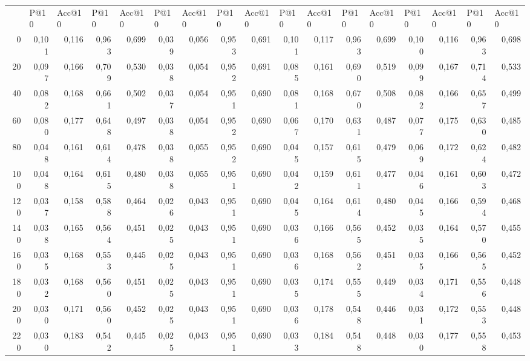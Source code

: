 \begin{table}[htb]
{\begin{tabular}{@{}rrrrrrrrrrrrrrrrr@{}}
\multicolumn{1}{l}{} & \multicolumn{1}{l}{P@10} & \multicolumn{1}{l}{Acc@10} & \multicolumn{1}{l}{P@10} & \multicolumn{1}{l}{Acc@10} & \multicolumn{1}{l}{P@10} & \multicolumn{1}{l}{Acc@10} & \multicolumn{1}{l}{P@10} & \multicolumn{1}{l}{Acc@10} & \multicolumn{1}{l}{P@10} & \multicolumn{1}{l}{Acc@10} & \multicolumn{1}{l}{P@10} & \multicolumn{1}{l}{Acc@10} & \multicolumn{1}{l}{P@10} & \multicolumn{1}{l}{Acc@10} & \multicolumn{1}{l}{P@10} & \multicolumn{1}{l}{Acc@10} \\ \cmidrule(r){1-17}
0 & 0,101 & 0,116 & 0,963 & 0,699 & 0,039 & 0,056 & 0,953 & 0,691 & 0,101 & 0,117 & 0,963 & 0,699 & 0,100 & 0,116 & 0,963 & 0,698 \\
20 & 0,097 & 0,166 & 0,709 & 0,530 & 0,038 & 0,054 & 0,952 & 0,691 & 0,085 & 0,161 & 0,690 & 0,519 & 0,099 & 0,167 & 0,714 & 0,533 \\
40 & 0,082 & 0,168 & 0,661 & 0,502 & 0,037 & 0,054 & 0,951 & 0,690 & 0,081 & 0,168 & 0,670 & 0,508 & 0,082 & 0,166 & 0,657 & 0,499 \\
60 & 0,080 & 0,177 & 0,648 & 0,497 & 0,038 & 0,054 & 0,952 & 0,690 & 0,067 & 0,170 & 0,631 & 0,487 & 0,077 & 0,175 & 0,630 & 0,485 \\
80 & 0,048 & 0,161 & 0,614 & 0,478 & 0,038 & 0,055 & 0,952 & 0,690 & 0,045 & 0,157 & 0,615 & 0,479 & 0,069 & 0,172 & 0,624 & 0,482 \\
100 & 0,048 & 0,164 & 0,615 & 0,480 & 0,038 & 0,055 & 0,951 & 0,690 & 0,042 & 0,159 & 0,611 & 0,477 & 0,046 & 0,161 & 0,603 & 0,472 \\
120 & 0,037 & 0,158 & 0,588 & 0,464 & 0,026 & 0,043 & 0,951 & 0,690 & 0,045 & 0,164 & 0,614 & 0,480 & 0,045 & 0,166 & 0,594 & 0,468 \\
140 & 0,038 & 0,165 & 0,564 & 0,451 & 0,025 & 0,043 & 0,951 & 0,690 & 0,036 & 0,166 & 0,565 & 0,452 & 0,035 & 0,164 & 0,570 & 0,455 \\
160 & 0,035 & 0,168 & 0,553 & 0,445 & 0,025 & 0,043 & 0,951 & 0,690 & 0,036 & 0,168 & 0,562 & 0,451 & 0,035 & 0,166 & 0,565 & 0,452 \\
180 & 0,032 & 0,168 & 0,560 & 0,451 & 0,025 & 0,043 & 0,951 & 0,690 & 0,035 & 0,174 & 0,555 & 0,449 & 0,034 & 0,171 & 0,556 & 0,448 \\
200 & 0,030 & 0,171 & 0,560 & 0,452 & 0,025 & 0,043 & 0,951 & 0,690 & 0,036 & 0,178 & 0,548 & 0,446 & 0,031 & 0,172 & 0,553 & 0,448 \\
220 & 0,030 & 0,183 & 0,542 & 0,445 & 0,025 & 0,043 & 0,951 & 0,690 & 0,033 & 0,184 & 0,548 & 0,448 & 0,030 & 0,177 & 0,558 & 0,453 \\

\end{tabular}}
\end{table}

